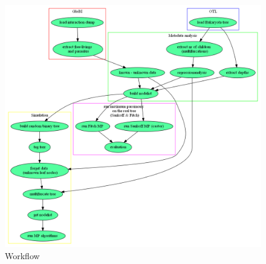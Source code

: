   
  \begin{figure}[h!]
    \caption{Workflow}
    \centering
    \label{fig:Workflow}
    \includegraphics[width=1\textwidth]{Figures/Workflow.png}
  \end{figure}


